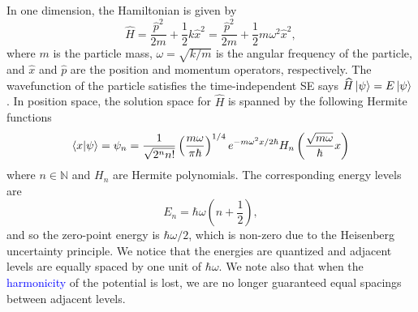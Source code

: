 \documentclass{book}
\theoremstyle{definition}
\newcommand{\f}[2]{\frac{#1}{#2}}
\newcommand{\lp}{\left(}
\newcommand{\rp}{\right)}
\begin{document}
In one dimension, the Hamiltonian is given by 
\begin{equation*}
\widehat{H} = \f{\widehat{p}^2}{2m} + \f{1}{2}k\widehat{x}^2 =  \f{\hat{p}^2}{2m} + \f{1}{2}m\omega^2 \widehat{x}^2,
\end{equation*}
where $m$ is the particle mass, $\omega = \sqrt{k/m}$ is the angular frequency of the particle, and $\widehat{x}$ and $\widehat{p}$ are the position and momentum operators, respectively. The wavefunction of the particle satisfies the time-independent SE says $\widehat{H}\ket{\psi} = E\ket{\psi}$. In position space, the solution space for $\widehat{H}$ is spanned by the following Hermite functions
\begin{equation*}
\bra{x}\ket{\psi} = \psi_n = \f{1}{\sqrt{2^n n!}} \lp \f{m\omega}{\pi \hbar} \rp^{1/4} e^{-m\omega^2 x/2\hbar} H_n\lp \f{\sqrt{m\omega}}{\hbar} x \rp
\end{equation*}
where $n \in \mathbb{N}$ and $H_n$ are Hermite polynomials. The corresponding energy levels are 
\begin{equation*}
E_n = \hbar \omega \lp n + \f{1}{2} \rp,
\end{equation*}
and so the zero-point energy is $\hbar\omega/2$, which is non-zero due to the Heisenberg uncertainty principle. We notice that the energies are quantized and adjacent levels are equally spaced by one unit of $\hbar\omega$. We note also that when the \textcolor{blue}{harmonicity} of the potential is lost, we are no longer guaranteed equal spacings between adjacent levels. \\
\end{document}
